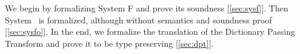 \noindent We begin by formalizing System F and prove its soundness [\ref{sec:sysf}]. Then System \Fo\ is formalized, although without semantics and soundness proof [\ref{sec:sysfo}]. In the end, we formalize the translation of the Dictionary Passing Transform and prove it to be type preserving [\ref{sec:dpt}].